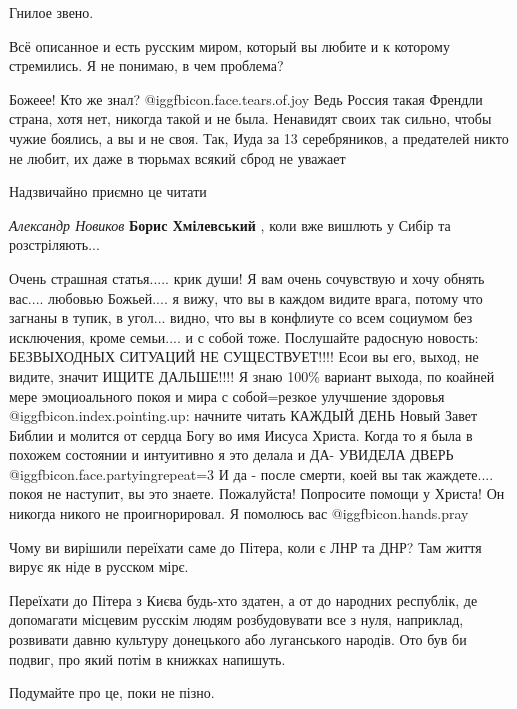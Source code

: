 \begin{itemize}
Гнилое звено.

Всё описанное и есть русским миром, который вы любите и к которому стремились. Я не понимаю, в чем проблема?


Божеее! Кто же знал?  @igg{fbicon.face.tears.of.joy}  Ведь Россия такая Френдли страна, хотя нет, никогда
такой и не была. Ненавидят своих так сильно, чтобы чужие боялись, а вы и не
своя. Так, Иуда за 13 серебряников, а предателей никто не любит, их даже в
тюрьмах всякий сброд не уважает

Надзвичайно приємно це читати

\begin{itemize} %
\emph{Александр Новиков}
\textbf{Борис Хмілевський} , коли вже вишлють у Сибір та розстріляють...
\end{itemize} %


Очень страшная статья..... крик души! Я вам очень сочувствую и хочу обнять
вас.... любовью Божьей.... я вижу, что вы в каждом видите врага, потому что
загнаны в тупик, в угол... видно, что вы в конфлиуте со всем социумом без
исключения, кроме семьи.... и с собой тоже. Послушайте радосную новость:
БЕЗВЫХОДНЫХ СИТУАЦИЙ НЕ СУЩЕСТВУЕТ!!!! Есои вы его, выход, не видите, значит
ИЩИТЕ ДАЛЬШЕ!!!! Я знаю 100\% вариант выхода, по коайней мере эмоциоального
покоя и мира с собой=резкое улучшение здоровья @igg{fbicon.index.pointing.up}: начните читать КАЖДЫЙ ДЕНЬ
Новый Завет Библии и молится от сердца Богу во имя Иисуса Христа. Когда то я
была в похожем состоянии и интуитивно я это делала и ДА- УВИДЕЛА ДВЕРЬ  @igg{fbicon.face.partying}{repeat=3}  И
да - после смерти, коей вы так жаждете.... покоя не наступит, вы это знаете.
Пожалуйста! Попросите помощи у Христа! Он никогда никого не проигнорировал. Я
помолюсь вас  @igg{fbicon.hands.pray} 


Чому ви вирішили переїхати саме до Пітера, коли є ЛНР та ДНР? Там життя вирує
як ніде в русском мірє.

Переїхати до Пітера з Києва будь-хто здатен, а от до народних республік, де
допомагати місцевим русскім людям розбудовувати все з нуля, наприклад,
розвивати давню культуру донецького або луганського народів. Ото був би подвиг,
про який потім в книжках напишуть.

Подумайте про це, поки не пізно.


\end{itemize}
